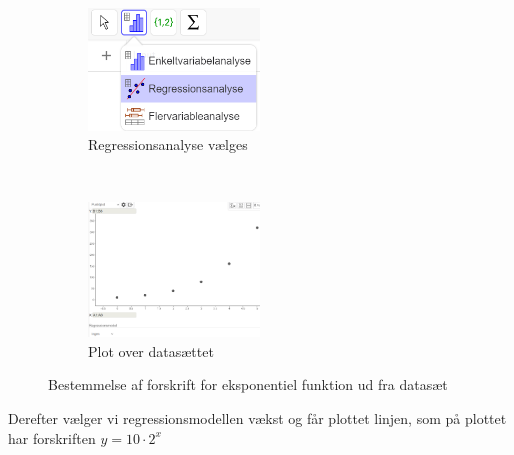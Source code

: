 \begin{figure}[ht]
    \centering
    \begin{subfigure}[t]{0.5\textwidth}
        \centering
        \includegraphics[width=0.5\textwidth]{img_3}
        \caption{Regressionsanalyse vælges}
    \end{subfigure}%
    ~ 
    \begin{subfigure}[t]{0.5\textwidth}
        \centering
        \includegraphics[width=0.5\textwidth]{img_4}
        \caption{Plot over datasættet}
    \end{subfigure}
    \caption{Bestemmelse af forskrift for eksponentiel funktion ud fra datasæt}
\end{figure}


Derefter vælger vi regressionsmodellen vækst og får plottet linjen, som på plottet har forskriften $y = 10\cdot 2^x$

